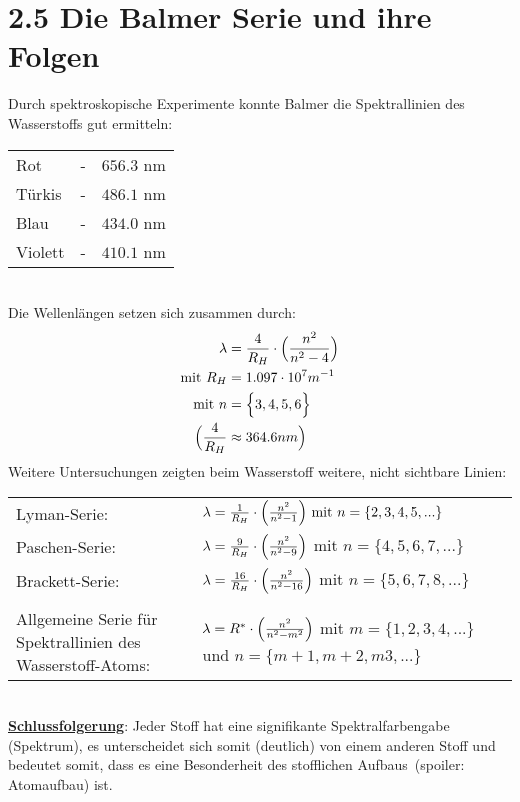 \documentclass[12pt,a4paper]{report}
\begin{document}
	\section*{2.5 Die Balmer Serie und ihre Folgen}
	Durch spektroskopische Experimente konnte Balmer die Spektrallinien des Wasserstoffs gut ermitteln:\\
	\begin{tabularx}{0.4\textwidth}{XXX}
		\\
		Rot & - & $656.3$ nm \\
		Türkis & - & $486.1$ nm \\
		Blau & - & $434.0$ nm \\
		Violett & - & $410.1$ nm \\
	\end{tabularx}
	\\[0.5cm]
	Die Wellenlängen setzen sich zusammen durch:
	\begin{align*}
		\lambda &= \frac{4}{R_H} \cdot \Bigl(\frac{n^2}{n^2-4}\Bigl) \\
		\text{mit}\ R_H &= 1.097 \cdot 10^{7}m^{-1} \\
		\text{mit}\ n &=\Bigl\{3,4,5,6\Bigl\} \\
		\Bigl(\frac{4}{R_H} &\approx 364.6nm \Bigl)
	\end{align*}
	Weitere Untersuchungen zeigten beim Wasserstoff weitere, nicht sichtbare Linien:
	\\
	\begin{tabularx}{\textwidth}{XX}
		\\
		Lyman-Serie: & $\lambda = \frac{1}{R_H} \cdot \Bigl(\frac{n^2}{n^2-1}\Bigl) \ \text{mit}\  n=\{2,3,4,5,...\}$ \\
		Paschen-Serie: & $\lambda = \frac{9}{R_H} \cdot \Bigl(\frac{n^2}{n^2-9}\Bigl)$ mit $n =\{4,5,6,7,...\}$\\
		Brackett-Serie: & $\lambda = \frac{16}{R_H} \cdot \Bigl(\frac{n^2}{n^2-16}\Bigl)$ mit $n =\{5,6,7,8,...\}$\\
		\\
		Allgemeine Serie für Spektrallinien des Wasserstoff-Atoms: & $\lambda = R^* \cdot \Bigl(\frac{n^2}{n^2-m^2}\Bigl)$ mit $m = \{1,2,3,4,...\}$ und $n =\{m+1,m+2,m3,...\}$ \\
	\end{tabularx}
	\\[0.5cm]
	\underline{\textbf{Schlussfolgerung}}: Jeder Stoff hat eine signifikante Spektralfarbengabe (Spektrum), es unterscheidet sich somit (deutlich) von einem anderen Stoff und bedeutet somit, dass es eine Besonderheit des \dq stofflichen Aufbaus\dq\ (spoiler: Atomaufbau) ist.
\end{document}
